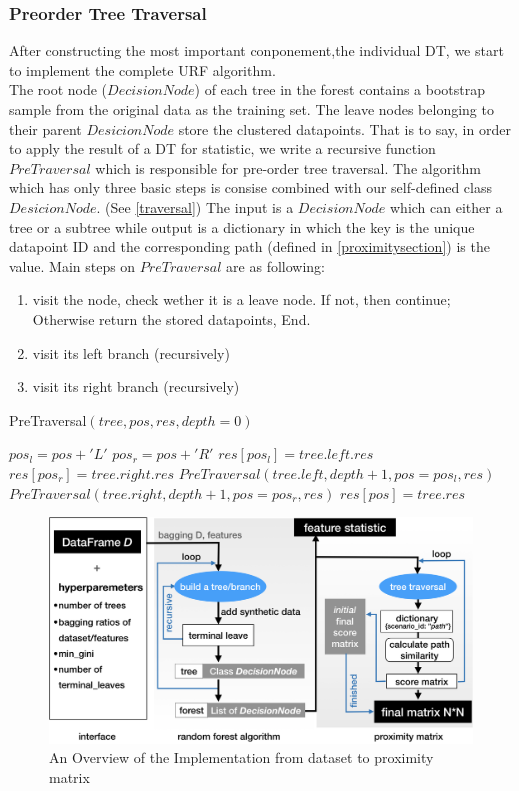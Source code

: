 \documentclass[conference]{IEEEtran}
\begin{document}
  \subsubsection{Preorder Tree Traversal}
  After constructing the most important conponement,the individual DT, we start to implement the complete URF algorithm.
  \\The root node ($DecisionNode$) of each tree in the forest contains a bootstrap sample from the original data as the training set. The leave nodes belonging to their parent $DesicionNode$ store the clustered datapoints.
  That is to say, in order to apply the result of a DT for statistic, we write a recursive function $PreTraversal$ which is responsible for pre-order tree traversal. The algorithm which has only three basic steps is consise combined with our self-defined class $DesicionNode$. (See \autoref{traversal})
  The input is a $DecisionNode$ which can either a tree or a subtree while output is a dictionary in which the key is the unique datapoint ID and the corresponding path (defined in \autoref{proximitysection}) is the value. 
  Main steps on $PreTraversal$ are as following:
  \begin{enumerate}
    \item visit the node, check wether it is a leave node. If not, then continue; Otherwise return the stored datapoints, End.
    \item visit its left branch (recursively)
    \item visit its right branch (recursively)
    \end{enumerate}
  \begin{algorithm}[!h]
    \caption{PreTraversal$(tree,pos,res,depth=0)$}
    \label{traversal}
    \begin{algorithmic}[1]
      \STATE $pos_l = pos + 'L' $
      \STATE $pos_r = pos + 'R' $
      \STATE $res[pos_l] = tree.left.res$
      \ENDIF
      \STATE $res[pos_r] = tree.right.res$
      \ENDIF
      \STATE$PreTraversal(tree.left,depth+1,pos=pos_l,res)$
      \STATE$PreTraversal(tree.right,depth+1,pos=pos_r,res)$
      \ELSE
      \STATE $res[pos] = tree.res$
      \ENDIF
    \end{algorithmic}
  \end{algorithm}
  \begin{figure}[!t]
    \centering
    \includegraphics[width=5in]{./images/diagram}
    \caption{An Overview of the Implementation from dataset to proximity matrix}
    \label{overview}
    \end{figure}
\end{document}
